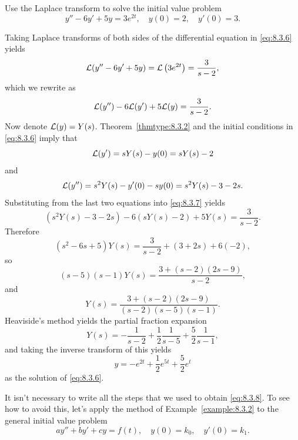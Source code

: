 \begin{example}
  \label{example:8.3.2}\rm Use the Laplace transform to solve the initial value problem
  \begin{equation}
    \label{eq:8.3.6}y''-6y'+5y=3e^{2t},\quad y(0)=2,\quad y'(0)=3.
  \end{equation}
\end{example}

\begin{examplesolution}
\solution Taking Laplace transforms of both sides of the differential equation in \eqref{eq:8.3.6}
yields
\[
  {\cal L}(y''-6y'+5y)={\cal L}\left(3e^{2t}\right)=\frac{3}{s-2},
\]
which we rewrite as
\begin{equation}
  \label{eq:8.3.7}{\cal L}(y'')-6{\cal L}(y')+5{\cal L}(y)=\frac{3}{s-2}.
\end{equation}
Now denote ${\cal L}(y)=Y(s)$. Theorem~\ref{thmtype:8.3.2} and the initial conditions in
\eqref{eq:8.3.6} imply that
\[
  {\cal L}(y')=sY(s)-y(0)=sY(s)-2
\]
and
\[
  {\cal L}(y'')=s^{2}Y(s)-y'(0)-sy(0)=s^{2}Y(s)-3-2s.
\]
Substituting from the last two equations into \eqref{eq:8.3.7} yields
\[
  \left(s^{2}Y(s)-3-2s\right)-6\left(sY(s)-2\right)+5Y(s)=\frac{3}{s-2}.
\]
Therefore
\begin{equation}
  \label{eq:8.3.8}(s^{2}-6s+5)Y(s)=\frac{3}{s-2}+(3+2s)+6(-2),
\end{equation}
so
\[
  (s-5)(s-1)Y(s)=\frac{3+(s-2)(2s-9)}{s-2},
\]
and
\[
  Y(s)=\frac{3+(s-2)(2s-9)}{(s-2)(s-5)(s-1)}.
\]
Heaviside's method yields the partial fraction expansion
\[
  Y(s)=-\frac{1}{s-2}+\frac{1}{2}\frac{1}{s-5}+\frac{5}{2}\frac{1}{s-1},
\]
and taking the inverse transform of this yields
\[
  y=-e^{2t}+\frac{1}{2}e^{5t}+\frac{5}{2}e^{t}
\]
as the solution of \eqref{eq:8.3.6}.\bbox
\end{examplesolution}

It isn't necessary to write all the steps that we used to obtain \eqref{eq:8.3.8}. To see how to
avoid this, let's apply the method of Example~\ref{example:8.3.2} to the general initial value
problem
\begin{equation}
  \label{eq:8.3.9}ay''+by'+cy=f(t),\quad y(0)=k_{0},\quad y'(0)=k_{1}.
\end{equation}

